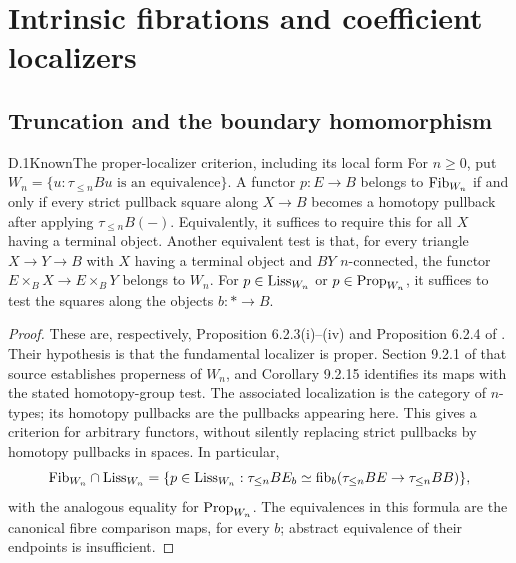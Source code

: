 \section{Intrinsic fibrations and coefficient localizers}
\subsection{Truncation and the boundary homomorphism}
\begin{claim}{D.1}{Known}{The proper-localizer criterion, including its local form}
For $n\geq0$, put $W_n=\{u:\tau_{\leq n}Bu\text{ is an equivalence}\}$. A functor $p:E\to B$ belongs to $\mathrm{Fib}_{W_n}$ if and only if every strict pullback square along $X\to B$ becomes a homotopy pullback after applying $\tau_{\leq n}B(-)$. Equivalently, it suffices to require this for all $X$ having a terminal object. Another equivalent test is that, for every triangle $X\to Y\to B$ with $X$ having a terminal object and $BY$ $n$-connected, the functor $E\times_BX\to E\times_BY$ belongs to $W_n$. For $p\in\mathrm{Liss}_{W_n}$ or $p\in\mathrm{Prop}_{W_n}$, it suffices to test the squares along the objects $b:*\to B$.
\end{claim}
\begin{proof}
These are, respectively, Proposition 6.2.3(i)--(iv) and Proposition 6.2.4 of \citet{RESCisinski2006}. Their hypothesis is that the fundamental localizer is proper. Section 9.2.1 of that source establishes properness of $W_n$, and Corollary 9.2.15 identifies its maps with the stated homotopy-group test. The associated localization is the category of $n$-types; its homotopy pullbacks are the pullbacks appearing here. This gives a criterion for arbitrary functors, without silently replacing strict pullbacks by homotopy pullbacks in spaces. In particular,
\[
\mathrm{Fib}_{W_n}\cap\mathrm{Liss}_{W_n}
 =\{p\in\mathrm{Liss}_{W_n}:\tau_{\leq n}BE_b\simeq
 \operatorname{fib}_b(\tau_{\leq n}BE\to\tau_{\leq n}BB)\},
\]
with the analogous equality for $\mathrm{Prop}_{W_n}$. The equivalences in this formula are the canonical fibre comparison maps, for every $b$; abstract equivalence of their endpoints is insufficient.
\end{proof}

